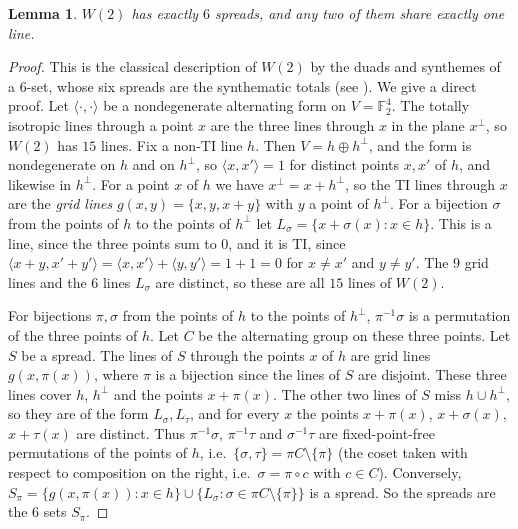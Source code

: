 \documentclass[11pt]{amsart}
\newtheorem{lemma}[theorem]{Lemma}
\theoremstyle{definition}
\newcommand{\F}{\mathbb{F}}
\begin{document}
\begin{lemma}\label{lem:W2}
$W(2)$ has exactly $6$ spreads, and any two of them share exactly one line.
\end{lemma}
\begin{proof}
This is the classical description of $W(2)$ by the duads and synthemes of a $6$-set, whose six spreads are the synthematic totals \textup{(}see \cite{PT09}\textup{)}. We give a direct proof. Let $\langle\cdot,\cdot\rangle$ be a nondegenerate alternating form on $V=\F_2^4$. The totally isotropic lines through a point $x$ are the three lines through $x$ in the plane $x^\perp$, so $W(2)$ has $15$ lines. Fix a non-TI line $h$. Then $V=h\oplus h^\perp$, and the form is nondegenerate on $h$ and on $h^\perp$, so $\langle x,x'\rangle=1$ for distinct points $x,x'$ of $h$, and likewise in $h^\perp$. For a point $x$ of $h$ we have $x^\perp=x+h^\perp$, so the TI lines through $x$ are the \emph{grid lines} $g(x,y)=\{x,y,x+y\}$ with $y$ a point of $h^\perp$. For a bijection $\sigma$ from the points of $h$ to the points of $h^\perp$ let $L_\sigma=\{x+\sigma(x):x\in h\}$. This is a line, since the three points sum to $0$, and it is TI, since $\langle x+y,x'+y'\rangle=\langle x,x'\rangle+\langle y,y'\rangle=1+1=0$ for $x\ne x'$ and $y\ne y'$. The $9$ grid lines and the $6$ lines $L_\sigma$ are distinct, so these are all $15$ lines of $W(2)$.

For bijections $\pi,\sigma$ from the points of $h$ to the points of $h^\perp$, $\pi^{-1}\sigma$ is a permutation of the three points of $h$. Let $C$ be the alternating group on these three points. Let $S$ be a spread. The lines of $S$ through the points $x$ of $h$ are grid lines $g(x,\pi(x))$, where $\pi$ is a bijection since the lines of $S$ are disjoint. These three lines cover $h$, $h^\perp$ and the points $x+\pi(x)$. The other two lines of $S$ miss $h\cup h^\perp$, so they are of the form $L_\sigma,L_\tau$, and for every $x$ the points $x+\pi(x)$, $x+\sigma(x)$, $x+\tau(x)$ are distinct. Thus $\pi^{-1}\sigma$, $\pi^{-1}\tau$ and $\sigma^{-1}\tau$ are fixed-point-free permutations of the points of $h$, i.e.\ $\{\sigma,\tau\}=\pi C\setminus\{\pi\}$ (the coset taken with respect to composition on the right, i.e.\ $\sigma=\pi\circ c$ with $c\in C$). Conversely, $S_\pi=\{g(x,\pi(x)):x\in h\}\cup\{L_\sigma:\sigma\in\pi C\setminus\{\pi\}\}$ is a spread. So the spreads are the $6$ sets $S_\pi$.


\end{proof}
\end{document}
